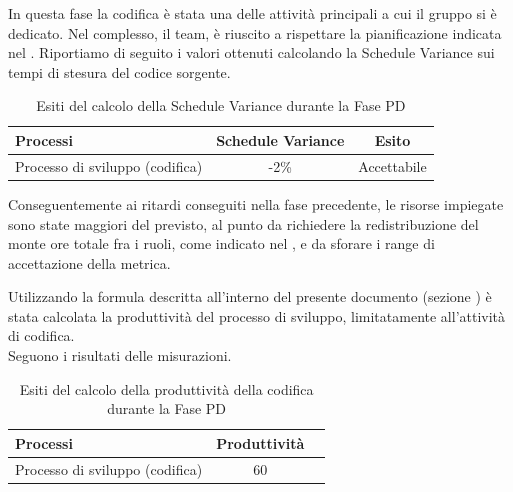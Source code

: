 			In questa fase la codifica è stata una delle attività principali a cui il gruppo si è dedicato. Nel complesso, il team, è riuscito a rispettare la pianificazione indicata nel . Riportiamo di seguito i valori ottenuti calcolando la Schedule Variance sui tempi di stesura del codice sorgente.
			\begin{table}[H]
				\centering
				\begin{tabu}{| l | c | c |}
					\hline
						Processi 						& Schedule Variance	& Esito		\\ \hline \hline
						Processo di sviluppo (codifica) & -2\% & Accettabile \\ \hline
				\end{tabu}
				\caption{Esiti del calcolo della Schedule Variance durante la Fase PD}
			\end{table}	
						
			Conseguentemente ai ritardi conseguiti nella fase precedente, le risorse impiegate sono state maggiori del previsto, al punto da richiedere la redistribuzione del monte ore totale fra i ruoli, come indicato nel , e da sforare i range di accettazione della metrica.
							
			Utilizzando la formula descritta all'interno del presente documento (sezione ) è stata calcolata la produttività del processo di sviluppo, limitatamente all'attività di codifica. \\
			Seguono i risultati delle misurazioni.
			\\ 
			\begin{table}[H]
				\centering
				\begin{tabu}{| l | c | c |}
					\hline
						Processi 						& Produttività		\\ \hline \hline
						Processo di sviluppo (codifica) & 60   \\ \hline
				\end{tabu}
				\caption{Esiti del calcolo della produttività della codifica durante la Fase PD}
			\end{table}	
					
